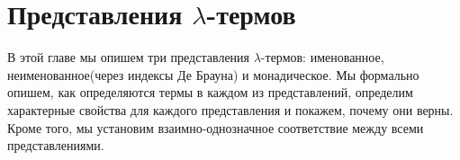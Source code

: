 \section{Представления \texorpdfstring{$\lambda$}{лямбда}-термов}

В этой главе мы опишем три представления $\lambda$-термов: именованное, неименованное(через индексы Де Брауна) и монадическое. Мы формально опишем, как определяются термы в каждом из представлений, определим характерные свойства для каждого представления и покажем, почему они верны. Кроме того, мы установим взаимно-однозначное соответствие между всеми представлениями.





